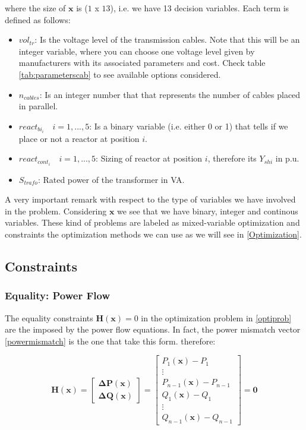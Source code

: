 \documentclass[a4paper,11pt, titlepage, twoside]{article}
\begin{document}
where the size of $\mathbf{x}$ is ($1$ x $13$), i.e. we have 13 decision variables. Each term is defined as follows:
\begin{itemize}
    \item $vol_{tr}$: Is the voltage level of the transmission cables. Note that this will be an integer variable, where you can choose one voltage level
    given by manufacturers with its associated parameters and cost. Check table \ref{tab:parameterscab} to see available options considered.
    \item $n_{cables}$: Is an integer number that that represents the number of cables placed in parallel.
    \item $react_{bi_i} \quad i=1,...,5$: Is a binary variable (i.e. either 0 or 1) that tells if we place or not a reactor at position $i$.
    \item $react_{cont_i} \quad i=1,...,5$: Sizing of reactor at position $i$, therefore its $Y_{shi}$ in p.u.
    \item $S_{trafo}$: Rated power of the transformer in VA.
\end{itemize}

A very important remark with respect to the type of variables we have involved in the problem. Considering $\mathbf{x}$ we see that we have 
binary, integer and continous variables. These kind of problems are labeled as mixed-variable optimization and constraints the optimization 
methods we can use as we will see in \ref{Optimization}.


\subsection{Constraints}
\subsubsection{Equality: Power Flow}\label{equality}

The equality constraints $ \mathbf{H(x)} = 0$ in the optimization problem in \ref{optiprob} are the imposed by the power flow equations. In fact, the power mismatch vector \ref{powermismatch} is the one that take this form. therefore:

\begin{equation}
    \mathbf{H(x)} = \begin{bmatrix}
    \mathbf{\Delta P(\mathbf{x})} \\
    \mathbf{\Delta Q(\mathbf{x})}
    \end{bmatrix} = \begin{bmatrix}
    P_1(\mathbf{x}) - P_1 \\
    \vdots \\
    P_{n-1}(\mathbf{x}) - P_{n-1} \\
    Q_1(\mathbf{x}) - Q_1 \\
    \vdots \\
    Q_{n-1}(\mathbf{x}) - Q_{n-1}
    \end{bmatrix} = \mathbf{0}
\end{equation}
\end{document}
